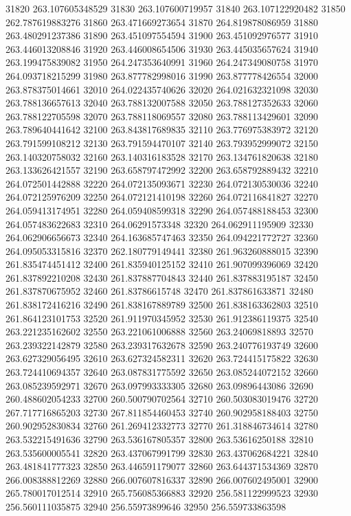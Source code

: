 {31820 263.107605348529
31830 263.107600719957
31840 263.107122920482
31850 262.787619883276
31860 263.471669273654
31870 264.819878086959
31880 263.480291237386
31890 263.451097554594
31900 263.451092976577
31910 263.446013208846
31920 263.446008654506
31930 263.445035657624
31940 263.199475839082
31950 264.247353640991
31960 264.247349080758
31970 264.093718215299
31980 263.877782998016
31990 263.877778426554
32000 263.878375014661
32010 264.022435740626
32020 264.021632321098
32030 263.788136657613
32040 263.788132007588
32050 263.788127352633
32060 263.788122705598
32070 263.788118069557
32080 263.788113429601
32090 263.789640441642
32100 263.843817689835
32110 263.776975383972
32120 263.791599108212
32130 263.791594470107
32140 263.793952999072
32150 263.140320758032
32160 263.140316183528
32170 263.134761820638
32180 263.133626421557
32190 263.658797472992
32200 263.658792889432
32210 264.072501442888
32220 264.072135093671
32230 264.072130530036
32240 264.072125976209
32250 264.072121410198
32260 264.072116841827
32270 264.059413174951
32280 264.059408599318
32290 264.057488188453
32300 264.057483622683
32310 264.06291573348
32320 264.062911195909
32330 264.062906656673
32340 264.163685747463
32350 264.094221772727
32360 264.095053315816
32370 262.180779149441
32380 261.963260888015
32390 261.835474451412
32400 261.835940125152
32410 261.907099396069
32420 261.837892210208
32430 261.837887704843
32440 261.837883195187
32450 261.837870675952
32460 261.83786615748
32470 261.837861633871
32480 261.838172416216
32490 261.838167889789
32500 261.838163362803
32510 261.864123101753
32520 261.911970345952
32530 261.912386119375
32540 263.221235162602
32550 263.221061006888
32560 263.24069818893
32570 263.239322142879
32580 263.239317632678
32590 263.240776193749
32600 263.627329056495
32610 263.627324582311
32620 263.724415175822
32630 263.724410694357
32640 263.087831775592
32650 263.085244072152
32660 263.085239592971
32670 263.097993333305
32680 263.09896443086
32690 260.488602054233
32700 260.500790702564
32710 260.503083019476
32720 267.717716865203
32730 267.811854460453
32740 260.902958188403
32750 260.902952830834
32760 261.269412332773
32770 261.318846734614
32780 263.532215491636
32790 263.536167805357
32800 263.53616250188
32810 263.535600005541
32820 263.437067991799
32830 263.437062684221
32840 263.481841777323
32850 263.446591179077
32860 263.644371534369
32870 266.008388812269
32880 266.007607816337
32890 266.007602495001
32900 265.780017012514
32910 265.756085366883
32920 256.581122999523
32930 256.560111035875
32940 256.55973899646
32950 256.559733863598
}

